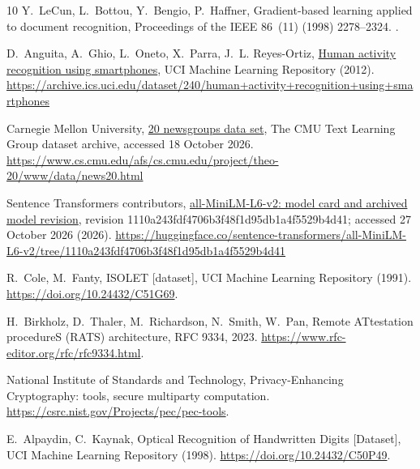 \documentclass[5p,times,twocolumn]{elsarticle}
\begin{document}
\begin{thebibliography}{10}
Y.~LeCun, L.~Bottou, Y.~Bengio, P.~Haffner, Gradient-based learning applied to
  document recognition, Proceedings of the IEEE 86~(11) (1998) 2278--2324.
\newblock \href {https://doi.org/10.1109/5.726791}
  {}.

D.~Anguita, A.~Ghio, L.~Oneto, X.~Parra, J.~L. Reyes-Ortiz,
  \href{https://archive.ics.uci.edu/dataset/240/human+activity+recognition+using+smartphones}{Human
  activity recognition using smartphones}, UCI Machine Learning Repository
  (2012).
\newline\urlprefix\url{https://archive.ics.uci.edu/dataset/240/human+activity+recognition+using+smartphones}

{Carnegie Mellon University},
  \href{https://www.cs.cmu.edu/afs/cs.cmu.edu/project/theo-20/www/data/news20.html}{20
  newsgroups data set}, The CMU Text Learning Group dataset archive, accessed
  18 October 2026.
\newline\urlprefix\url{https://www.cs.cmu.edu/afs/cs.cmu.edu/project/theo-20/www/data/news20.html}

{Sentence Transformers contributors},
  \href{https://huggingface.co/sentence-transformers/all-MiniLM-L6-v2/tree/1110a243fdf4706b3f48f1d95db1a4f5529b4d41}{{all-MiniLM-L6-v2}:
  model card and archived model revision}, revision
  1110a243fdf4706b3f48f1d95db1a4f5529b4d41; accessed 27 October 2026 (2026).
\newline\urlprefix\url{https://huggingface.co/sentence-transformers/all-MiniLM-L6-v2/tree/1110a243fdf4706b3f48f1d95db1a4f5529b4d41}

R.~Cole, M.~Fanty, ISOLET [dataset], UCI Machine Learning Repository
(1991). \newblock \url{https://doi.org/10.24432/C51G69}.

H.~Birkholz, D.~Thaler, M.~Richardson, N.~Smith, W.~Pan,
Remote ATtestation procedureS (RATS) architecture, RFC 9334, 2023.
\newblock \url{https://www.rfc-editor.org/rfc/rfc9334.html}.

National Institute of Standards and Technology,
Privacy-Enhancing Cryptography: tools, secure multiparty computation.
\newblock \url{https://csrc.nist.gov/Projects/pec/pec-tools}.

E.~Alpaydin, C.~Kaynak, Optical Recognition of Handwritten Digits
[Dataset], UCI Machine Learning Repository (1998).
\newblock \url{https://doi.org/10.24432/C50P49}.

\end{thebibliography}
\end{document}
